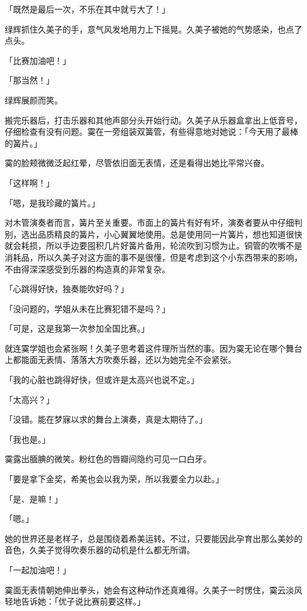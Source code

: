 \documentclass[UTF8]{ctexart}
\begin{document}
    「既然是最后一次，不乐在其中就亏大了！」 

    绿辉抓住久美子的手，意气风发地用力上下摇晃。久美子被她的气势感染，也点了点头。 

    「比赛加油吧！」 

    「那当然！」 

    绿辉展颜而笑。 

    搬完乐器后，打击乐器和其他声部分头开始行动。久美子从乐器盒拿出上低音号，仔细检查有没有问题。霙在一旁组装双簧管，有些得意地对她说：「今天用了最棒的簧片。」 

    霙的脸颊微微泛起红晕，尽管依旧面无表情，还是看得出她比平常兴奋。 

    「这样啊！」 

    「嗯，是我珍藏的簧片。」 

    对木管演奏者而言，簧片至关重要。市面上的簧片有好有坏，演奏者要从中仔细判别，选出品质精良的簧片，小心翼翼地使用。总是使用同一片簧片，想也知道很快就会耗损，所以手边要囤积几片好簧片备用，轮流吹到习惯为止。铜管的吹嘴不是消耗品，所以久美子对这方面的事不是很懂，但是考虑到这个小东西带来的影响，不由得深深感受到乐器的构造真的非常复杂。 

    「心跳得好快，独奏能吹好吗？」 

    「没问题的，学姐从未在比赛犯错不是吗？」 

    「可是，这是我第一次参加全国比赛。」 

    就连霙学姐也会紧张啊！久美子思考着这件理所当然的事。因为霙无论在哪个舞台上都能面无表情、落落大方吹奏乐器，还以为她完全不会紧张。 

    「我的心脏也跳得好快，但或许是太高兴也说不定。」 

    「太高兴？」 

    「没错。能在梦寐以求的舞台上演奏，真是太期待了。」 

    「我也是。」 

    霙露出腼腆的微笑。粉红色的唇瓣间隐约可见一口白牙。 

    「要是拿下金奖，希美也会以我为荣，所以我要全力以赴。」 

    「是、是嘛！」 

    「嗯。」 

    她的世界还是老样子，总是围绕着希美运转。不过，只要能因此孕育出那么美妙的音色，久美子觉得吹奏乐器的动机是什么都无所谓。 

    「一起加油吧！」 

    霙面无表情朝她伸出拳头，她会有这种动作还真难得。久美子一时愣住，霙云淡风轻地告诉她：「优子说比赛前要这样。」 
\end{document}
